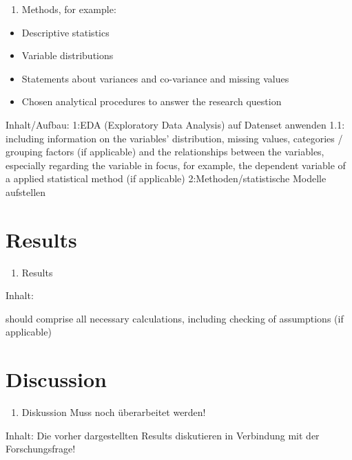 \documentclass[
  11pt,
  a4paper,
  twoside]{scrbook}
\providecommand{\tightlist}{%
  \setlength{\itemsep}{0pt}\setlength{\parskip}{0pt}}
\begin{document}
\begin{enumerate}
\def\labelenumi{\arabic{enumi}.}
\setcounter{enumi}{2}
\tightlist
\item
  Methods, for example:
\end{enumerate}

\begin{itemize}
\tightlist
\item
  Descriptive statistics
\item
  Variable distributions
\item
  Statements about variances and co-variance and missing values
\item
  Chosen analytical procedures to answer the research question
\end{itemize}

Inhalt/Aufbau:
1:EDA (Exploratory Data Analysis) auf Datenset anwenden
1.1: including information on the variables' distribution, missing values,
categories / grouping factors (if applicable) and the relationships between the variables, especially
regarding the variable in focus, for example, the dependent variable of a applied statistical method (if
applicable)
2:Methoden/statistische Modelle aufstellen

\hypertarget{results}{%
\chapter{Results}\label{results}}

\begin{enumerate}
\def\labelenumi{\arabic{enumi}.}
\setcounter{enumi}{3}
\tightlist
\item
  Results
\end{enumerate}

Inhalt:

should comprise all necessary calculations, including checking of assumptions (if
applicable)

\hypertarget{discussion}{%
\chapter{Discussion}\label{discussion}}

\begin{enumerate}
\def\labelenumi{\arabic{enumi}.}
\setcounter{enumi}{4}
\tightlist
\item
  Diskussion
  Muss noch überarbeitet werden!
\end{enumerate}

Inhalt:
Die vorher dargestellten Results diskutieren in Verbindung mit der Forschungsfrage!
\end{document}
